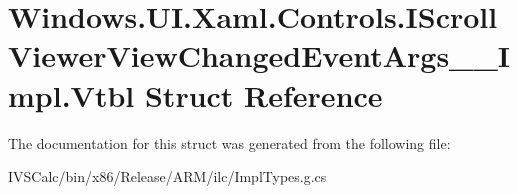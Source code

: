 \hypertarget{struct_windows_1_1_u_i_1_1_xaml_1_1_controls_1_1_i_scroll_viewer_view_changed_event_args_____impl_1_1_vtbl}{}\section{Windows.\+U\+I.\+Xaml.\+Controls.\+I\+Scroll\+Viewer\+View\+Changed\+Event\+Args\+\_\+\+\_\+\+Impl.\+Vtbl Struct Reference}
\label{struct_windows_1_1_u_i_1_1_xaml_1_1_controls_1_1_i_scroll_viewer_view_changed_event_args_____impl_1_1_vtbl}


The documentation for this struct was generated from the following file\+:\begin{DoxyCompactItemize}
\item 
I\+V\+S\+Calc/bin/x86/\+Release/\+A\+R\+M/ilc/Impl\+Types.\+g.\+cs\end{DoxyCompactItemize}
